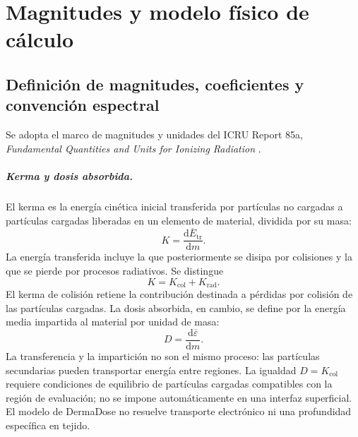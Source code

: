 \chapter{Magnitudes y modelo físico de cálculo}
\section{Definición de magnitudes, coeficientes y convención espectral}
Se adopta el marco de magnitudes y unidades del ICRU Report 85a, \emph{Fundamental Quantities and Units for Ionizing Radiation} \citep{icru85a}.

\paragraph{Kerma y dosis absorbida.}
El kerma es la energía cinética inicial transferida por partículas no cargadas a partículas cargadas liberadas en un elemento de material, dividida por su masa:
\begin{equation}
K=\frac{\mathrm d\overline{E}_{\mathrm{tr}}}{\mathrm dm}.
\end{equation}
La energía transferida incluye la que posteriormente se disipa por colisiones y la que se pierde por procesos radiativos. Se distingue
\begin{equation}
K=K_{\mathrm{col}}+K_{\mathrm{rad}}.
\end{equation}
El kerma de colisión retiene la contribución destinada a pérdidas por colisión de las partículas cargadas. La dosis absorbida, en cambio, se define por la energía media impartida al material por unidad de masa:
\begin{equation}
D=\frac{\mathrm d\overline{\varepsilon}}{\mathrm dm}.
\end{equation}
La transferencia y la impartición no son el mismo proceso: las partículas secundarias pueden transportar energía entre regiones. La igualdad $D=K_{\mathrm{col}}$ requiere condiciones de equilibrio de partículas cargadas compatibles con la región de evaluación; no se impone automáticamente en una interfaz superficial. El modelo de DermaDose no resuelve transporte electrónico ni una profundidad específica en tejido.

